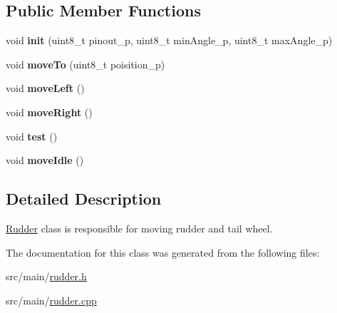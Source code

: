 \subsection*{Public Member Functions}
\begin{DoxyCompactItemize}
\item 
\mbox{\label{class_rudder_a5117dfc1ea046631ca6137b168f506e5}} 
void {\bfseries init} (uint8\+\_\+t pinout\+\_\+p, uint8\+\_\+t min\+Angle\+\_\+p, uint8\+\_\+t max\+Angle\+\_\+p)
\item 
\mbox{\label{class_rudder_a1bf10aa23c5bd527e0fd157591f3f6f5}} 
void {\bfseries move\+To} (uint8\+\_\+t poisition\+\_\+p)
\item 
\mbox{\label{class_rudder_a3dce7b87cc604843f220bed6c87bf354}} 
void {\bfseries move\+Left} ()
\item 
\mbox{\label{class_rudder_a8d220196bb6eafec577f023e309d4292}} 
void {\bfseries move\+Right} ()
\item 
\mbox{\label{class_rudder_ad7cad6188f74c31c15cbf13f92fc13a5}} 
void {\bfseries test} ()
\item 
\mbox{\label{class_rudder_a06ef5a93fc4877c8fe8099949e9e6743}} 
void {\bfseries move\+Idle} ()
\end{DoxyCompactItemize}


\subsection{Detailed Description}
\hyperlink{class_rudder}{Rudder} class is responsible for moving rudder and tail wheel. 

The documentation for this class was generated from the following files\+:\begin{DoxyCompactItemize}
\item 
src/main/\hyperlink{rudder_8h}{rudder.\+h}\item 
src/main/\hyperlink{rudder_8cpp}{rudder.\+cpp}\end{DoxyCompactItemize}

